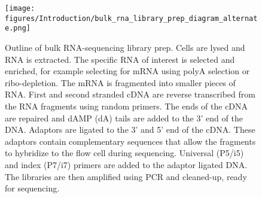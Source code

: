\begin{figure}[ht]
\centering
\texttt{[image: figures/Introduction/bulk\_rna\_library\_prep\_diagram\_alternate.png]}
\caption[Bulk RNA-seq outline]{Outline of bulk RNA-sequencing library prep.
Cells are lysed and RNA is extracted.
The specific RNA of interest is selected and enriched, for example selecting for mRNA using polyA selection or ribo-depletion.
The mRNA is fragmented into smaller pieces of RNA.
First and second stranded cDNA are reverse transcribed from the RNA fragments using random primers.
The ends of the cDNA are repaired and dAMP (dA) tails are added to the 3' end of the DNA.
Adaptors are ligated to the 3' and 5' end of the cDNA.
These adaptors contain complementary sequences that allow the fragments to hybridize to the flow cell during sequencing.
Universal (P5/i5) and index (P7/i7) primers are added to the adaptor ligated DNA.
The libraries are then amplified using PCR and cleaned-up, ready for sequencing.
}
\label{fig:bulk_diagram}\end{figure}

